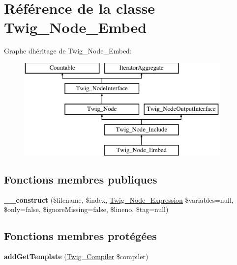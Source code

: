 \hypertarget{class_twig___node___embed}{}\section{Référence de la classe Twig\+\_\+\+Node\+\_\+\+Embed}
\label{class_twig___node___embed}
Graphe d\textquotesingle{}héritage de Twig\+\_\+\+Node\+\_\+\+Embed\+:\begin{figure}[H]
\begin{center}
\leavevmode
\includegraphics[height=5.000000cm]{class_twig___node___embed}
\end{center}
\end{figure}
\subsection*{Fonctions membres publiques}
\begin{DoxyCompactItemize}
\item 
{\bfseries \+\_\+\+\_\+construct} (\$filename, \$index, \hyperlink{class_twig___node___expression}{Twig\+\_\+\+Node\+\_\+\+Expression} \$variables=null, \$only=false, \$ignore\+Missing=false, \$lineno, \$tag=null)\hypertarget{class_twig___node___embed_a48750108ff916e667f44f0474427f06b}{}\label{class_twig___node___embed_a48750108ff916e667f44f0474427f06b}

\end{DoxyCompactItemize}
\subsection*{Fonctions membres protégées}
\begin{DoxyCompactItemize}
\item 
{\bfseries add\+Get\+Template} (\hyperlink{class_twig___compiler}{Twig\+\_\+\+Compiler} \$compiler)\hypertarget{class_twig___node___embed_a899e31f4c948a6fd44a4ec27c4dbe5a3}{}\label{class_twig___node___embed_a899e31f4c948a6fd44a4ec27c4dbe5a3}

\end{DoxyCompactItemize}
